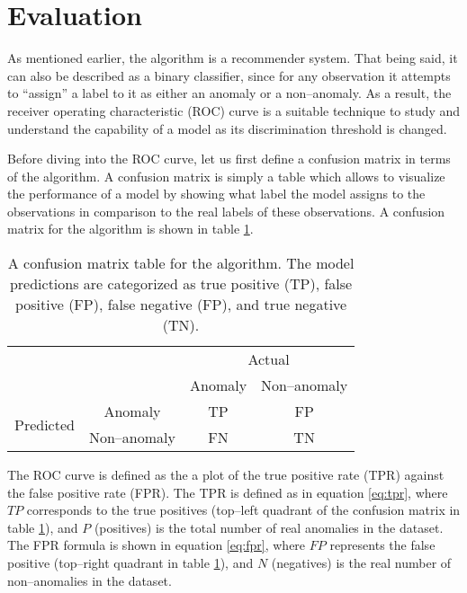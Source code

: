 \section{Evaluation} \label{sect:meth:evaluation}

As mentioned earlier, the \mlblink algorithm is a recommender system. That being said, it can also be described as a binary classifier, since for any observation it attempts to ``assign'' a label to it as either an anomaly or a non--anomaly. As a result, the receiver operating characteristic (ROC) curve is a suitable technique to study and understand the capability of a model as its discrimination threshold is changed. \newline

Before diving into the ROC curve, let us first define a confusion matrix in terms of the \mlblink algorithm. A confusion matrix is simply a table which allows to visualize the performance of a model by showing what label the model assigns to the observations in comparison to the real labels of these observations. A confusion matrix for the \mlblink algorithm is shown in table \ref{table:confusion-matrix}.

\begin{table}[H]
    \centering
    \begin{tabular}{cc|cc}
        \multicolumn{2}{c}{}
        & \multicolumn{2}{c}{Actual} \\
        &       &   Anomaly &   Non--anomaly \\ 
        \cline{2-4}
        \multirow{2}{*}{Predicted}
            & Anomaly         & TP   & FP  \\
            & Non--anomaly    & FN   & TN  \\ 
            \cline{2-4}
    \end{tabular}
    \caption{A confusion matrix table for the \mlblink algorithm. The model predictions are categorized as true positive (TP), false positive (FP), false negative (FP), and true negative (TN).}
    \label{table:confusion-matrix}
\end{table}

The ROC curve is defined as the a plot of the true positive rate (TPR) against the false positive rate (FPR). The TPR is defined as in equation \ref{eq:tpr}, where $TP$ corresponds to the true positives (top--left quadrant of the confusion matrix in table \ref{table:confusion-matrix}), and $P$ (positives) is the total number of real anomalies in the dataset. The FPR formula is shown in equation \ref{eq:fpr}, where $FP$ represents the false positive (top--right quadrant in table \ref{table:confusion-matrix}), and $N$ (negatives) is the real number of non--anomalies in the dataset.

